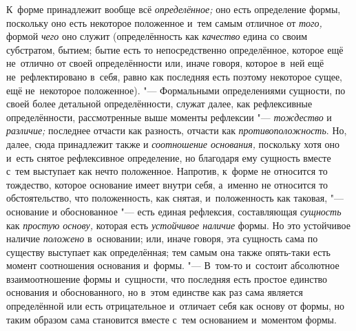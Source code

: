 К~форме принадлежит вообще всё {\em определённое;} оно есть определение формы,
поскольку оно есть некоторое положенное и~тем самым отличное от {\em того,}
формой {\em чего} оно служит (определённость как {\em качество} едина со своим
субстратом, бытием; бытие есть то непосредственно определённое, которое ещё
не~отлично от своей определённости или, иначе говоря, которое в~ней ещё
не~рефлектировано в~себя, равно как последняя есть поэтому некоторое сущее, ещё
не~некоторое положенное). "--- Формальными определениями сущности, по своей
более детальной определённости, служат далее, как рефлексивные определённости,
рассмотренные выше моменты рефлексии "--- {\em тождество} и {\em различие;}
последнее отчасти как разность, отчасти как {\em противоположность}. Но, далее,
сюда принадлежит также и {\em соотношение основания,} поскольку хотя оно и~есть
снятое рефлексивное определение, но благодаря ему сущность вместе с~тем
выступает как нечто положенное. Напротив, к~форме не относится то тождество,
которое основание имеет внутри себя, а~именно не относится то обстоятельство,
что положенность, как снятая, и~положенность как таковая, "--- основание и
обоснованное "--- есть единая рефлексия, составляющая {\em сущность} как
{\em простую основу,} которая есть {\em устойчивое наличие} формы. Но это
устойчивое наличие {\em положено} в~основании; или, иначе говоря, эта сущность
сама по существу выступает как определённая; тем самым она также опять-таки
есть момент соотношения основания и~формы. "--- В~том-то и~состоит абсолютное
взаимоотношение формы и~сущности, что последняя есть простое единство основания
и обоснованного, но в~этом единстве как раз сама является определённой или есть
отрицательное и~отличает себя как основу от формы, но таким образом сама
становится вместе с~тем основанием и~моментом формы.


